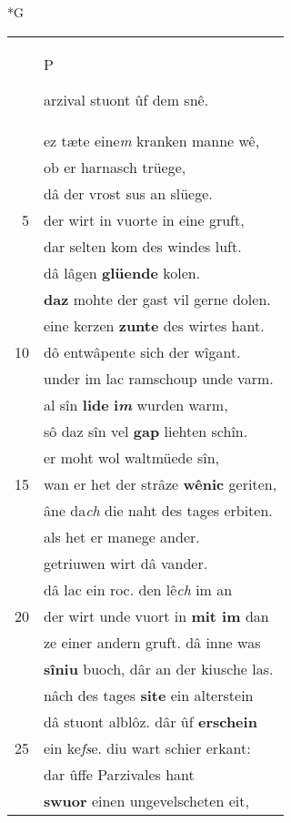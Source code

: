 \documentclass[8pt,a4paper,notitlepage]{article}
\begin{document}
\newpage
\begin{table}[ht]
\begin{minipage}[t]{0.5\linewidth}
\small
\begin{center}*G
\end{center}
\begin{tabular}{rl}
 & \begin{large}P\end{large}arzival stuont ûf dem snê. \\ 
 & ez tæte eine\textit{m} kranken manne wê,\\ 
 & ob er harnasch trüege,\\ 
 & dâ der vrost sus an slüege.\\ 
5 & der wirt in vuorte in eine gruft,\\ 
 & dar selten kom des windes luft.\\ 
 & dâ lâgen \textbf{glüende} kolen.\\ 
 & \textbf{daz} mohte der gast vil gerne dolen.\\ 
 & eine kerzen \textbf{zunte} des wirtes hant.\\ 
10 & dô entwâpente sich der wîgant.\\ 
 & under im lac ramschoup unde varm.\\ 
 & al sîn \textbf{lide} \textbf{i\textit{m}} wurden warm,\\ 
 & sô daz sîn vel \textbf{gap} liehten schîn.\\ 
 & er moht wol waltmüede sîn,\\ 
15 & wan er het der strâze \textbf{wênic} geriten,\\ 
 & âne da\textit{ch} die naht des tages erbiten.\\ 
 & als het er manege ander.\\ 
 & getriuwen wirt dâ vander.\\ 
 & dâ lac ein roc. den lê\textit{ch} im an\\ 
20 & der wirt unde vuort in \textbf{mit im} dan\\ 
 & ze einer andern gruft. dâ inne was\\ 
 & \textbf{sîniu} buoch, dâr an der kiusche las.\\ 
 & nâch des tages \textbf{site} ein alterstein\\ 
 & dâ stuont alblôz. dâr ûf \textbf{erschein}\\ 
25 & ein ke\textit{fs}e. diu wart schier erkant:\\ 
 & dar ûffe Parzivales hant\\ 
 & \textbf{swuor} einen ungevelscheten eit,\\ 

\end{tabular}
\end{minipage}
\end{table}
\end{document}

